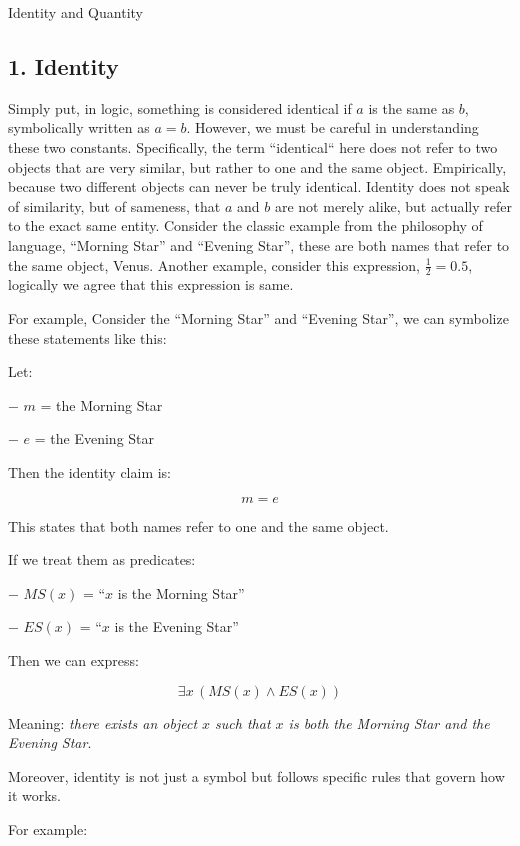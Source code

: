 Identity and Quantity

\subsection{1. Identity}\label{identity}

Simply put, in logic, something is considered identical if \(a\) is the
same as \(b\), symbolically written as \(a = b\). However, we must be
careful in understanding these two constants. Specifically, the term
``identical`` here does not refer to two objects that are very similar,
but rather to one and the same object. Empirically, because two
different objects can never be truly identical. Identity does not speak
of similarity, but of sameness, that \(a\) and \(b\) are not merely
alike, but actually refer to the exact same entity. Consider the classic
example from the philosophy of language, ``Morning Star'' and ``Evening
Star'', these are both names that refer to the same object, Venus.
Another example, consider this expression, \(\frac{1}{2} = 0.5\),
logically we agree that this expression is same.

For example, Consider the ``Morning Star'' and ``Evening Star'', we can
symbolize these statements like this:

Let:

− \(m\) = the Morning Star

− \(e\) = the Evening Star

Then the identity claim is:

\[ m = e \]

This states that both names refer to one and the same object.

If we treat them as predicates:

− \(MS(x)\) = ``\(x\) is the Morning Star''

− \(ES(x)\) = ``\(x\) is the Evening Star''

Then we can express:

\[\exists x \, (MS(x) \land ES(x))\]

Meaning: \emph{there exists an object \(x\) such that \(x\) is both the
Morning Star and the Evening Star}.

Moreover, identity is not just a symbol but follows specific rules that
govern how it works.

For example:

